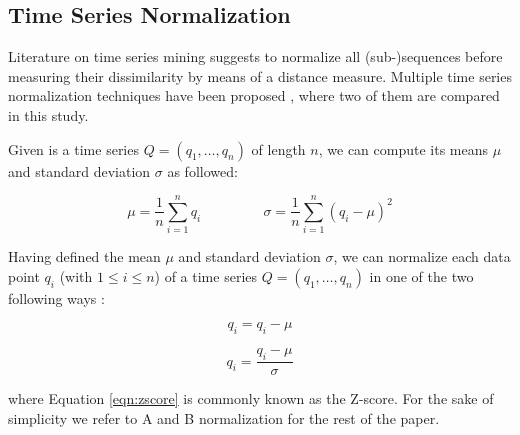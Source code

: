 \subsection{Time Series Normalization} \label{time_series_normalization}

Literature on time series mining \cite{ding2008querying,spiegel2015diss} suggests to normalize all (sub-)sequences before measuring their dissimilarity by means of a distance measure. Multiple time series normalization techniques have been proposed \cite{das1998rule}, where two of them are compared in this study.

Given is a time series $Q = (q_1, \dots, q_n)$ of length $n$, we can compute its means $\mu$ and standard deviation $\sigma$ as followed:

\begin{equation*}
\mu = \frac{1}{n} \sum_{i=1}^{n} q_i 	\;\;\;\;\;\;\;\;\;\;\;\;\;\;\;\; 	\sigma = \frac{1}{n} \sum_{i=1}^{n} (q_i - \mu)^2
\end{equation*}

Having defined the mean $\mu$ and standard deviation $\sigma$, we can normalize each data point $q_i$ (with $1\leq i \leq n$) of a time series $Q = (q_1, \dots, q_n)$ in one of the two following ways \cite{das1998rule}:

\begin{equation}
q_i = q_i - \mu
\end{equation}

\begin{equation}
q_i = \frac{q_i - \mu}{\sigma}
\label{eqn:zscore}
\end{equation}

where Equation \ref{eqn:zscore} is commonly known as the Z-score. For the sake of simplicity we refer to A and B normalization for the rest of the paper.


